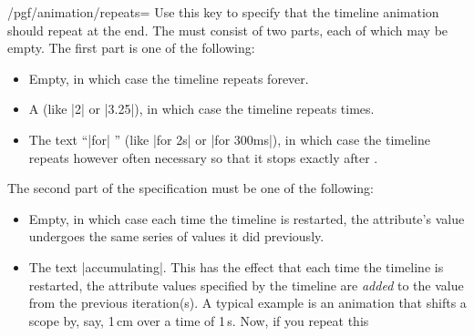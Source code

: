 \begin{key}{/pgf/animation/repeats=}
  Use this key to specify that the timeline animation should repeat at
  the end. The  must consist of two parts, each of
  which may be empty. The first part is one of the following:
  \begin{itemize}
  \item Empty, in which case the timeline repeats forever.
\begin{codeexample}[animation list={1,2,3,4,5}]
\end{codeexample}
  \item A  (like |2| or |3.25|), in which case the
    timeline repeats  times.
\begin{codeexample}[animation list={1,2,3,4,5}]
\end{codeexample}
  \item The text ``|for| '' (like |for 2s| or |for 300ms|),
    in which case the timeline repeats however often necessary so that
    it  stops exactly after .
\begin{codeexample}[animation list={1,2,3,4,5}]
\end{codeexample}
  \end{itemize}
  The second part of the specification must be one of the following:
  \begin{itemize}
  \item Empty, in which case each time the timeline is restarted, the
    attribute's value undergoes the same series of values it did
    previously.
  \item The text |accumulating|. This has the effect that each time
    the timeline is restarted, the attribute values specified by the
    timeline are \emph{added} to the value from the previous
    iteration(s). A typical example is an animation that shifts a
    scope by, say, 1\,cm over a time of 1\,s. Now, if you repeat this

\end{itemize}
\end{key}
